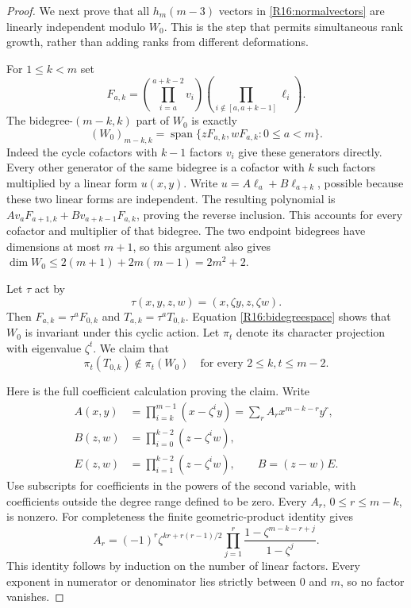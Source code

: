 \begin{proof}
We next prove that all $h_m(m-3)$ vectors in
\eqref{R16:normalvectors} are linearly independent modulo
$W_0$. This is the step that permits simultaneous rank growth,
rather than adding ranks from different deformations.

For $1\leq k<m$ set
\[
 F_{a,k}
   =\left(\prod_{i=a}^{a+k-2}v_i\right)
     \left(\prod_{i\notin[a,a+k-1]}\ell_i\right).
\]
The bidegree-$(m-k,k)$ part of $W_0$ is exactly
\begin{equation}\label{R16:bidegreespace}
 (W_0)_{m-k,k}
   =\operatorname{span}\{zF_{a,k},wF_{a,k}:0\leq a<m\}.
\end{equation}
Indeed the cycle cofactors with $k-1$ factors $v_i$ give
these generators directly. Every other generator of the
same bidegree is a cofactor with $k$ such factors multiplied
by a linear form $u(x,y)$. Write
$u=A\ell_a+B\ell_{a+k}$, possible because these two
linear forms are independent. The resulting polynomial is
$A v_aF_{a+1,k}+B v_{a+k-1}F_{a,k}$, proving the reverse
inclusion. This accounts for every cofactor and multiplier
of that bidegree. The two endpoint bidegrees have dimensions
at most $m+1$, so this argument also gives
$\dim W_0\leq2(m+1)+2m(m-1)=2m^2+2$.

Let $\tau$ act by
\[
 \tau(x,y,z,w)=(x,\zeta y,z,\zeta w).
\]
Then $F_{a,k}=\tau^aF_{0,k}$ and
$T_{a,k}=\tau^aT_{0,k}$. Equation
\eqref{R16:bidegreespace} shows that $W_0$ is invariant
under this cyclic action. Let $\pi_t$ denote its character
projection with eigenvalue $\zeta^t$.
We claim that
\begin{equation}\label{R16:allmodes}
 \pi_t(T_{0,k})\notin\pi_t(W_0)
 \quad\text{for every }2\leq k,t\leq m-2.
\end{equation}

Here is the full coefficient calculation proving the claim.
Write
\[
 \begin{aligned}
 A(x,y)&=\prod_{i=k}^{m-1}(x-\zeta^iy)
       =\sum_r A_r x^{m-k-r}y^r,\\
 B(z,w)&=\prod_{i=0}^{k-2}(z-\zeta^iw),\\
 E(z,w)&=\prod_{i=1}^{k-2}(z-\zeta^iw),\qquad B=(z-w)E.
 \end{aligned}
\]
Use subscripts for coefficients in the powers of the second
variable, with coefficients outside the degree range defined
to be zero. Every $A_r$, $0\leq r\leq m-k$, is nonzero.
For completeness the finite geometric-product identity gives
\[
 A_r=(-1)^r\zeta^{kr+r(r-1)/2}
      \prod_{j=1}^{r}
       \frac{1-\zeta^{m-k-r+j}}{1-\zeta^j}.
\]
This identity follows by induction on the number of linear
factors. Every exponent in numerator or denominator lies
strictly between $0$ and $m$, so no factor vanishes.


\end{proof}
